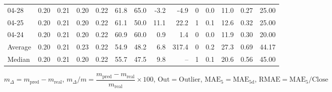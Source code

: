 \begin{threeparttable}
{\begin{tabular}{lrrrrrrrrrrrrr}
  04-28 &          0.20 &          0.21 &          0.20 &        0.22 &                61.8 &                65.0 &       -3.2 &         -4.9 &              0 &                 0.0 &             11.0 &            0.27 &                  25.00 \\
  04-25 &          0.20 &          0.21 &          0.20 &        0.22 &                61.1 &                50.0 &       11.1 &         22.2 &              1 &                 0.1 &             12.6 &            0.32 &                  25.00 \\
  04-24 &          0.20 &          0.21 &          0.20 &        0.22 &                60.9 &                60.0 &        0.9 &          1.4 &              0 &                 0.0 &             11.9 &            0.30 &                  20.00 \\
Average &          0.20 &          0.21 &          0.23 &        0.22 &                54.9 &                48.2 &        6.8 &        317.4 &              0 &                 0.2 &             27.3 &            0.69 &                  44.17 \\
 Median &          0.20 &          0.21 &          0.20 &        0.22 &                55.7 &                47.5 &        9.8 &           -- &              1 &                 0.1 &             20.6 &            0.56 &                  45.00 \\
\bottomrule
\end{tabular}
}
\begin{tablenotes}\footnotesize
\item $m_\Delta=m_{\text{pred}}-m_{\text{real}}$,
$m_\Delta/m=\dfrac{m_{\text{pred}}-m_{\text{real}}}{m_{\text{real}}}\times100$,
$\mathrm{Out}=\text{Outlier}$,
$\mathrm{MAE}_5=\mathrm{MAE}_{5\text{d}}$,
$\mathrm{RMAE}=\mathrm{MAE}_5/\text{Close}$
\end{tablenotes}
\end{threeparttable}
\endgroup

